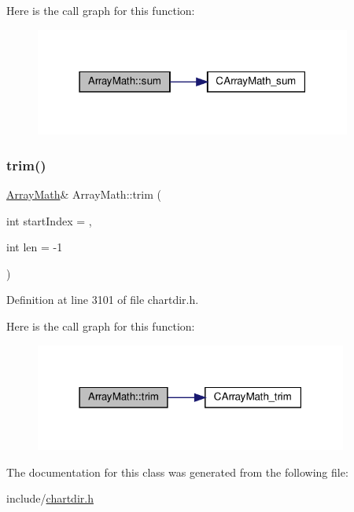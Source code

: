 Here is the call graph for this function\+:
\nopagebreak
\begin{figure}[H]
\begin{center}
\leavevmode
\includegraphics[width=295pt]{class_array_math_a864604ac04b95fa04fcd511d1845ebbd_cgraph}
\end{center}
\end{figure}
\mbox{\label{class_array_math_a07cdedd06b274fbd5a5be338cd507861}} 
\subsubsection{\texorpdfstring{trim()}{trim()}}
{\footnotesize\ttfamily \hyperlink{class_array_math}{Array\+Math}\& Array\+Math\+::trim (\begin{DoxyParamCaption}\item[{int}]{start\+Index = {},  }\item[{int}]{len = {\ttfamily -\/1} }\end{DoxyParamCaption})\hspace{0.3cm}{\ttfamily [inline]}}



Definition at line 3101 of file chartdir.\+h.

Here is the call graph for this function\+:
\nopagebreak
\begin{figure}[H]
\begin{center}
\leavevmode
\includegraphics[width=291pt]{class_array_math_a07cdedd06b274fbd5a5be338cd507861_cgraph}
\end{center}
\end{figure}


The documentation for this class was generated from the following file\+:\begin{DoxyCompactItemize}
\item 
include/\hyperlink{chartdir_8h}{chartdir.\+h}\end{DoxyCompactItemize}
